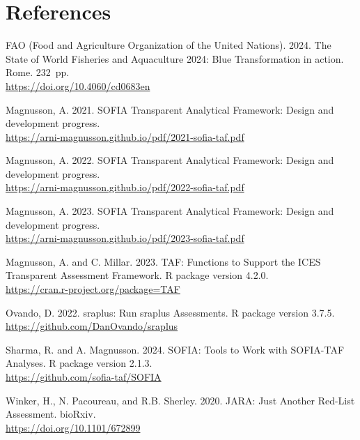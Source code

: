 \documentclass[12pt]{article}
\newcommand\blue[1]{\textcolor{darkblue}{#1}}
\begin{document}
\vspace{3ex}


\section{References}

\small\sloppy\setlength{}\selectfont
\begin{description}\setlength\itemsep{0.5ex}\vspace{0.5ex}

  \item FAO (Food and Agriculture Organization of the United Nations). 2024. The
  State of World Fisheries and Aquaculture 2024: Blue Transformation in action. Rome.
  232~pp.\\
  \blue{\footnotesize\url{https://doi.org/10.4060/cd0683en}}

  \item Magnusson, A. 2021. SOFIA Transparent Analytical Framework: Design and
  development progress.\\
  \blue{%
    \footnotesize\url{https://arni-magnusson.github.io/pdf/2021-sofia-taf.pdf}}

  \item Magnusson, A. 2022. SOFIA Transparent Analytical Framework: Design and
  development progress.\\
  \blue{%
    \footnotesize\url{https://arni-magnusson.github.io/pdf/2022-sofia-taf.pdf}}

  \item Magnusson, A. 2023. SOFIA Transparent Analytical Framework: Design and
  development progress.\\
  \blue{%
    \footnotesize\url{https://arni-magnusson.github.io/pdf/2023-sofia-taf.pdf}}

  \item Magnusson, A. and C. Millar. 2023. TAF: Functions to Support the ICES
  Transparent Assessment Framework. R package version 4.2.0.\\
  \blue{\footnotesize\url{https://cran.r-project.org/package=TAF}}

  \item Ovando, D. 2022. sraplus: Run sraplus Assessments. R package version
  3.7.5.\\
  \blue{\footnotesize\url{https://github.com/DanOvando/sraplus}}

  \item Sharma, R. and A. Magnusson. 2024. SOFIA: Tools to Work with SOFIA-TAF
  Analyses. R package version 2.1.3.\\
  \blue{\footnotesize\url{https://github.com/sofia-taf/SOFIA}}

  \item Winker, H., N. Pacoureau, and R.B. Sherley. 2020. JARA: Just Another
  Red-List Assessment. bioRxiv.\\
  \blue{\footnotesize\url{https://doi.org/10.1101/672899}}

\end{description}
\end{document}
